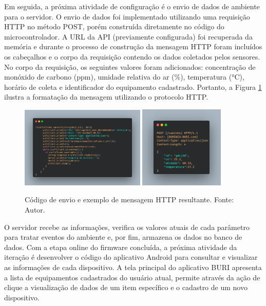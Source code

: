 Em seguida, a próxima atividade de configuração é o envio de dados de ambiente para o servidor. O envio de dados foi implementado utilizando uma requisição HTTP no método POST, porém 
construída diretamente no código do microcontrolador. A URL da API (previamente configurada) foi recuperada da memória e durante o processo de construção da mensagem HTTP foram 
incluídos os cabeçalhos e o corpo da requisição contendo os dados coletados pelos sensores. No corpo da requisição, os seguintes valores foram adicionados: concentração de monóxido de carbono (ppm), umidade relativa do ar (\%), 
temperatura (°C), horário de coleta e identificador do equipamento cadastrado. Portanto, a Figura \ref{figPostMeasurement} ilustra a formatação da mensagem utilizando o protocolo HTTP.

\begin{figure}[ht]
    \centering
    \includegraphics[width=0.53\textwidth]{img/POST-esp32-code.png}
    \hfill
    \includegraphics[width=0.36\textwidth]{img/POST-result.png}
    \caption{Código de envio e exemplo de mensagem HTTP resultante. Fonte: Autor.}\label{figPostMeasurement}
\end{figure}

O servidor recebe as informações, verifica os valores atuais de cada parâmetro para tratar eventos do ambiente e, por fim, armazena os dados no banco de dados. Com a etapa 
online do firmware concluída, a próxima atividade da iteração é desenvolver o código do aplicativo Android para consultar e visualizar as informações de cada dispositivo. A tela principal do 
aplicativo BURI apresenta a lista de equipamentos cadastrados do usuário atual, permite através da ação de clique a visualização de dados de um item específico e o cadastro de um novo dispositivo. 

